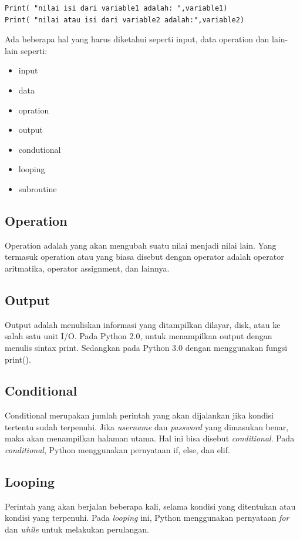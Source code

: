 \begin{verbatim}
Print( "nilai isi dari variable1 adalah: ",variable1)
Print( "nilai atau isi dari variable2 adalah:",variable2)
\end{verbatim}

Ada beberapa hal yang harus diketahui seperti input, data operation dan lain-lain seperti:

\begin{itemize}
	\item input
	\item data
	\item opration
	\item output
	\item condutional
	\item looping
	\item subroutine
\end{itemize}

\subsection {Operation}
Operation adalah yang akan mengubah suatu nilai menjadi nilai lain. Yang termasuk operation atau yang biasa disebut dengan operator adalah operator aritmatika, operator assignment, dan lainnya.

\subsection {Output}
Output adalah menuliskan informasi yang ditampilkan dilayar, disk, atau ke salah satu unit I/O. Pada Python 2.0, untuk menampilkan output dengan menulis sintax print. Sedangkan pada Python 3.0 dengan menggunakan fungsi print().

\subsection {Conditional}
Conditional merupakan jumlah perintah yang akan dijalankan jika kondisi tertentu sudah terpenuhi. Jika \textit{username} dan \textit{password} yang dimasukan benar, maka akan menampilkan halaman utama. Hal ini bisa disebut \textit{conditional}. Pada \textit{conditional}, Python menggunakan pernyataan if, else, dan elif.

\subsection {Looping}
Perintah yang akan berjalan beberapa kali, selama kondisi yang ditentukan atau kondisi yang terpenuhi. Pada \textit{looping} ini, Python menggunakan pernyataan \textit{for} dan \textit{while} untuk melakukan perulangan.

